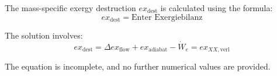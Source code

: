 The mass-specific exergy destruction \( ex_{\text{dest}} \) is calculated using the formula:  
\[
ex_{\text{dest}} = \text{Enter Exergiebilanz}
\]  

The solution involves:  
\[
ex_{\text{dest}} = \Delta ex_{\text{flow}} + ex_{\text{adiabat}} - \dot{W}_e = ex_{XX,\text{verl}}
\]  

The equation is incomplete, and no further numerical values are provided.